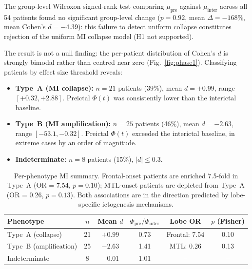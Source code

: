 \documentclass[a4paper,fleqn]{cas-dc}
\begin{document}
The group-level Wilcoxon signed-rank test comparing $\mu_{\text{pre}}$
against $\mu_{\text{inter}}$ across all 54 patients found no significant
group-level change ($p = 0.92$, mean $\Delta = -168\%$, mean Cohen's
$d = -4.39$): this failure to detect uniform collapse constitutes
rejection of the uniform MI collapse model (H1 not supported).

The result is not a null finding: the per-patient distribution of
Cohen's $d$ is strongly bimodal rather than centred near zero
(Fig.~\ref{fig:phase1}).
%
Classifying patients by effect size threshold reveals:

\begin{itemize}
  \item \textbf{Type~A (MI collapse):} $n = 21$ patients (39\%),
        mean $d = +0.99$, range $[+0.32, +2.88]$.
        Preictal $\Phi(t)$ was consistently lower than the interictal
        baseline.

  \item \textbf{Type~B (MI amplification):} $n = 25$ patients (46\%),
        mean $d = -2.63$, range $[-53.1, -0.32]$.
        Preictal $\Phi(t)$ exceeded the interictal baseline, in extreme
        cases by an order of magnitude.

  \item \textbf{Indeterminate:} $n = 8$ patients (15\%), $|d| \leq 0.3$.
\end{itemize}

\begin{table}[t]
\caption{Per-phenotype MI summary. Frontal-onset patients are enriched
  7.5-fold in Type~A (OR = 7.54, $p = 0.10$); MTL-onset patients are
  depleted from Type~A (OR = 0.26, $p = 0.13$). Both associations are
  in the direction predicted by lobe-specific ictogenesis mechanisms.}
\label{tab:phase1}
\begin{tabular*}{\textwidth}{@{\extracolsep{\fill}}lccccc@{}}
  \toprule
  Phenotype & $n$ & Mean $d$ & $\Phi_\text{pre}/\Phi_\text{inter}$
            & Lobe OR & $p$ (Fisher) \\
  \midrule
  Type~A (collapse)       & 21 & $+0.99$ & 0.73
    & Frontal: 7.54 & 0.10 \\
  Type~B (amplification)  & 25 & $-2.63$ & 1.41
    & MTL: 0.26     & 0.13 \\
  Indeterminate           & 8  & $-0.01$ & 1.01
    & {--}           & {--}  \\
  \bottomrule
\end{tabular*}
\end{table}
\end{document}
